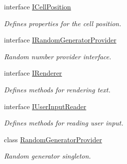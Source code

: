 \begin{DoxyCompactItemize}
interface \hyperlink{interface_minesweeper_1_1_lib_1_1_i_cell_position}{I\+Cell\+Position}
\begin{DoxyCompactList}\small\item\em Defines properties for the cell position. \end{DoxyCompactList}\item 
interface \hyperlink{interface_minesweeper_1_1_lib_1_1_i_random_generator_provider}{I\+Random\+Generator\+Provider}
\begin{DoxyCompactList}\small\item\em Random number provider interface. \end{DoxyCompactList}\item 
interface \hyperlink{interface_minesweeper_1_1_lib_1_1_i_renderer}{I\+Renderer}
\begin{DoxyCompactList}\small\item\em Defines methods for rendering text. \end{DoxyCompactList}\item 
interface \hyperlink{interface_minesweeper_1_1_lib_1_1_i_user_input_reader}{I\+User\+Input\+Reader}
\begin{DoxyCompactList}\small\item\em Defines methods for reading user input. \end{DoxyCompactList}\item 
class \hyperlink{class_minesweeper_1_1_lib_1_1_random_generator_provider}{Random\+Generator\+Provider}
\begin{DoxyCompactList}\small\item\em Random generator singleton. \end{DoxyCompactList}\end{DoxyCompactItemize}
